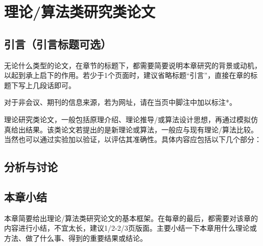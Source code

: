 \chapter{理论/算法类研究类论文}
\label{cha:fourthsection}



\section{引言（引言标题可选）}
\label{sec:parameters}
无论什么类型的论文，在章节的标题下，都需要简要说明本章研究的背景或动机，以起到承上启下的作用。若少于1个页面时，建议省略标题“引言”，直接在章的标题下写上几段话即可。

对于非会议、期刊的信息来源，若为网址，请在当页中脚注中加以标注*。

理论研究类论文，一般包括原理介绍、理论推导/或算法设计思想，再通过模拟仿真给出结果。该类论文若提出的是新理论或算法，一般应与现有理论/算法比较。当然也可以通过实验加以验证，以评估其准确性。具体内容应包括以下几个部分：



\section{分析与讨论}

\section{本章小结}
本章简要给出理论/算法类研究论文的基本框架。在每章的最后，都需要对该章的内容进行小结，不宜太长，建议1/2-2/3页版面。主要小结一下本章用什么理论或方法、做了什么事、得到的重要结果或结论。
